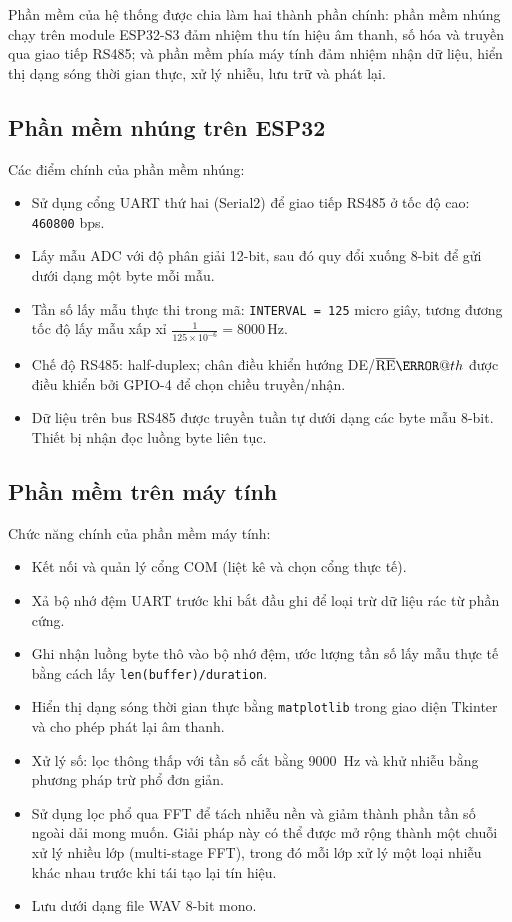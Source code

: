\documentclass[a4paper]{report}
\makeatletter
\newcommand*{\textoverline}[1]{$\overline{\hbox{#1}}\m@th$}
\makeatother
\begin{document}
Phần mềm của hệ thống được chia làm hai thành phần chính: phần mềm nhúng chạy trên module ESP32-S3 đảm nhiệm thu tín hiệu âm thanh, số hóa và truyền qua giao tiếp RS485; và phần mềm phía máy tính đảm nhiệm nhận dữ liệu, hiển thị dạng sóng thời gian thực, xử lý nhiễu, lưu trữ và phát lại.

\subsection{Phần mềm nhúng trên ESP32}

Các điểm chính của phần mềm nhúng:
\begin{itemize}
  \item Sử dụng cổng UART thứ hai (Serial2) để giao tiếp RS485 ở tốc độ cao: \texttt{460800} bps.
  \item Lấy mẫu ADC với độ phân giải 12-bit, sau đó quy đổi xuống 8-bit để gửi dưới dạng một byte mỗi mẫu.
  \item Tần số lấy mẫu thực thi trong mã: \verb|INTERVAL = 125| micro giây, tương đương tốc độ lấy mẫu xấp xỉ $\displaystyle\frac{1}{125\times 10^{-6}} = 8000\,$Hz.
  \item Chế độ RS485: half-duplex; chân điều khiển hướng DE/\textoverline{RE} được điều khiển bởi GPIO-4 để chọn chiều truyền/nhận.
  \item Dữ liệu trên bus RS485 được truyền tuần tự dưới dạng các byte mẫu 8-bit. Thiết bị nhận đọc luồng byte liên tục.
\end{itemize}

\subsection{Phần mềm trên máy tính}

Chức năng chính của phần mềm máy tính:
\begin{itemize}
  \item Kết nối và quản lý cổng COM (liệt kê và chọn cổng thực tế).
  \item Xả bộ nhớ đệm UART trước khi bắt đầu ghi để loại trừ dữ liệu rác từ phần cứng. %
  \item Ghi nhận luồng byte thô vào bộ nhớ đệm, ước lượng tần số lấy mẫu thực tế bằng cách lấy \verb|len(buffer)/duration|.
  \item Hiển thị dạng sóng thời gian thực bằng \texttt{matplotlib} trong giao diện Tkinter và cho phép phát lại âm thanh.
  \item Xử lý số: lọc thông thấp với tần số cắt bằng \qty{9000}{Hz} và khử nhiễu bằng phương pháp trừ phổ đơn giản.
  \item Sử dụng lọc phổ qua FFT để tách nhiễu nền và giảm thành phần tần số ngoài dải mong muốn. Giải pháp này có thể được mở rộng thành một chuỗi xử lý nhiều lớp (multi-stage FFT), trong đó mỗi lớp xử lý một loại nhiễu khác nhau trước khi tái tạo lại tín hiệu.
  \item Lưu dưới dạng file WAV 8-bit mono.
\end{itemize}
\end{document}
